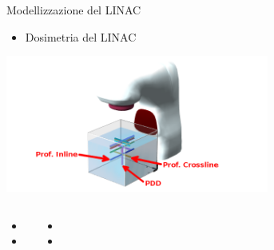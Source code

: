 \documentclass{beamer}
\begin{document}
\begin{frame}{Modellizzazione del LINAC}
\begin{itemize}
\scriptsize
{}
\item \alert{Dosimetria del LINAC}
\end{itemize}
\vspace{-.4cm}
\begin{center}
\includegraphics[height=4.5cm]{./img/Prof3D_ann.png}
\end{center}

\begin{columns}
\begin{itemize}
\footnotesize
\item {}
\item {}
\end{itemize}
\begin{itemize}
\footnotesize
\item {}
\item {}
\end{itemize}
\end{columns}
\end{frame}
\end{document}
